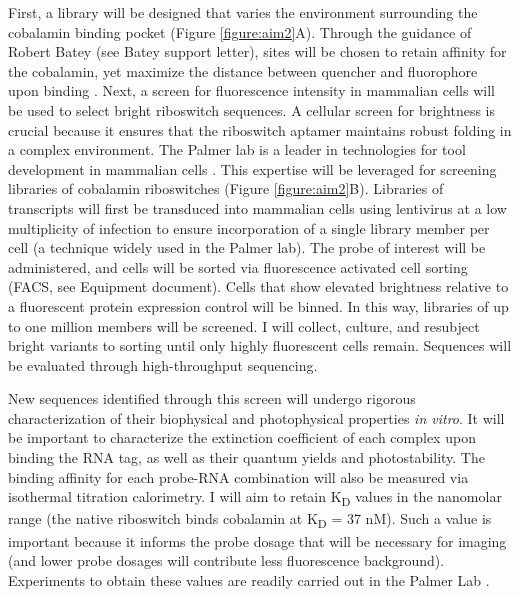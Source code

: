 First, a library will be designed that varies the environment surrounding the cobalamin binding pocket (Figure \ref{figure:aim2}A). Through the guidance of Robert Batey (see Batey support letter), sites will be chosen to retain affinity for the cobalamin, yet maximize the distance between quencher and fluorophore upon binding \cite{JohnsonJrB12cofactorsdirectly2012}.
Next, a screen for fluorescence intensity in mammalian cells will be used to select bright riboswitch sequences.
A cellular screen for brightness is crucial because it ensures that the riboswitch aptamer maintains robust folding in a complex environment.
The Palmer lab is a leader in technologies for tool development in mammalian cells \cite{FiedlerDropletMicrofluidicFlow2017,DeanHighSpeedMultiparameterPhotophysical2015}.
This expertise will be leveraged for screening libraries of cobalamin riboswitches (Figure \ref{figure:aim2}B). Libraries of transcripts will first be transduced into mammalian cells using lentivirus at a low multiplicity of infection to ensure incorporation of a single library member per cell (a technique widely used in the Palmer lab).
The probe of interest will be administered, and cells will be sorted via fluorescence activated cell sorting (FACS, see Equipment document).
Cells that show elevated brightness relative to a fluorescent protein expression control will be binned.
In this way, libraries of up to one million members will be screened.
I will collect, culture, and resubject bright variants to sorting until only highly fluorescent cells remain. Sequences will be evaluated through high-throughput sequencing.

New sequences identified through this screen will undergo rigorous characterization of their biophysical and photophysical properties \textit{in vitro}. It will be important to characterize the extinction coefficient of each complex upon binding the RNA tag, as well as their quantum yields and photostability. The binding affinity for each probe-RNA combination will also be measured via isothermal titration calorimetry.
I will aim to retain K\textsubscript{D} values in the nanomolar range (the native riboswitch binds cobalamin at K\textsubscript{D} = 37 nM).
Such a value is important because it informs the probe dosage that will be necessary for imaging (and lower probe dosages will contribute less fluorescence background). Experiments to obtain these values are readily carried out in the Palmer Lab  \cite{ParkQuantitativeMeasurementCa22014,BraselmannDevelopmentriboswitchbasedplatform2017}.

